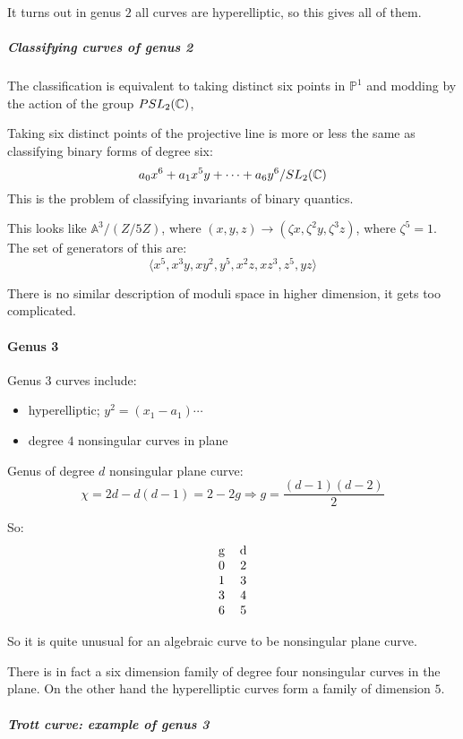 It turns out in genus $2$ all curves are hyperelliptic, so this gives all of them.

\subparagraph*{Classifying curves of genus 2}

The classification is equivalent to taking distinct six points in $\mathbb{P}^1$ and modding by the action of the group $PSL_2(\mathbb{C})$,

Taking six distinct points of the projective line is more or less the same as classifying binary forms of degree six:\[a_0x^6+a_1x^5 y+\cdots  + a_6y^6 / SL_2(\mathbb{C})\]
This is the problem of classifying invariants of binary quantics. 

This looks like $\mathbb{A}^3/(Z/5Z)$, where $(x,y,z)\rightarrow (\zeta x, \zeta^2 y, \zeta^3 z)$, where $\zeta^5=1$. The set of generators of this are:\[\langle x^5, x^3y, xy^2, y^5, x^2 z, xz^3, z^5, yz\rangle\]

There is no similar description of moduli space in higher dimension, it gets too complicated.

\paragraph*{Genus 3}
Genus $3$ curves include: \begin{itemize}
    \item hyperelliptic; $y^2 = (x_1-a_1)\cdots$
    \item degree $4$ nonsingular curves in plane
\end{itemize}

\begin{remark}
    Genus of degree $d$ nonsingular plane curve:\[\chi = 2d-d(d-1) = 2-2g \Rightarrow g = \frac{(d-1)(d-2)}{2}\]

    So:\[\begin{tabular}{cc}
        g & d\\
        0 & 2\\
        1 & 3\\
        3 & 4\\
        6 & 5
    \end{tabular}\]

    So it is quite unusual for an algebraic curve to be nonsingular plane curve.
\end{remark}

There is in fact a six dimension family of degree four nonsingular curves in the plane. On the other hand the hyperelliptic curves form a family of dimension $5$.

\subparagraph*{Trott curve: example of genus 3}

